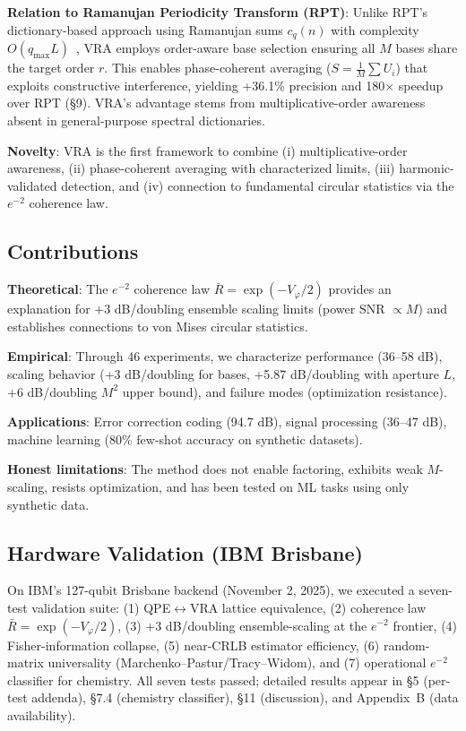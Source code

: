 \documentclass[10pt,twocolumn]{article}
\begin{document}
\textbf{Relation to Ramanujan Periodicity Transform (RPT)}: Unlike RPT's dictionary-based approach using Ramanujan sums $c_q(n)$ with complexity $O(q_{\max}L)$~\cite{vaidyanathan2014}, VRA employs order-aware base selection ensuring all $M$ bases share the target order $r$. This enables phase-coherent averaging ($S = \frac{1}{M}\sum U_i$) that exploits constructive interference, yielding +36.1\% precision and 180$\times$ speedup over RPT (\S9). VRA's advantage stems from multiplicative-order awareness absent in general-purpose spectral dictionaries.

\textbf{Novelty}: VRA is the first framework to combine (i) multiplicative-order awareness, (ii) phase-coherent averaging with characterized limits, (iii) harmonic-validated detection, and (iv) connection to fundamental circular statistics via the $e^{-2}$ coherence law.

\subsection{Contributions}

\textbf{Theoretical}: The $e^{-2}$ coherence law $\bar{R} = \exp(-V_\varphi/2)$ provides an explanation for +3 dB/doubling ensemble scaling limits (power SNR $\propto M$) and establishes connections to von Mises circular statistics.

\textbf{Empirical}: Through 46 experiments, we characterize performance (36--58 dB), scaling behavior (+3 dB/doubling for bases, +5.87 dB/doubling with aperture $L$, +6 dB/doubling $M^2$ upper bound), and failure modes (optimization resistance).

\textbf{Applications}: Error correction coding (94.7 dB), signal processing (36--47 dB), machine learning (80\% few-shot accuracy on synthetic datasets).

\textbf{Honest limitations}: The method does not enable factoring, exhibits weak $M$-scaling, resists optimization, and has been tested on ML tasks using only synthetic data.

\subsection{Hardware Validation (IBM Brisbane)}

On IBM's 127-qubit Brisbane backend (November 2, 2025), we executed a seven-test validation suite: (1) QPE$\leftrightarrow$VRA lattice equivalence, (2) coherence law $\bar{R} = \exp(-V_\varphi/2)$, (3) +3 dB/doubling ensemble-scaling at the $e^{-2}$ frontier, (4) Fisher-information collapse, (5) near-CRLB estimator efficiency, (6) random-matrix universality (Marchenko--Pastur/Tracy--Widom), and (7) operational $e^{-2}$ classifier for chemistry. All seven tests passed; detailed results appear in \S5 (per-test addenda), \S7.4 (chemistry classifier), \S11 (discussion), and Appendix~B (data availability).
\end{document}

